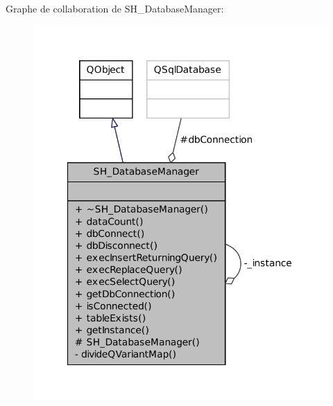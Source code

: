 Graphe de collaboration de S\-H\-\_\-\-Database\-Manager\-:
\nopagebreak
\begin{figure}[H]
\begin{center}
\leavevmode
\includegraphics[width=340pt]{classSH__DatabaseManager__coll__graph}
\end{center}
\end{figure}

